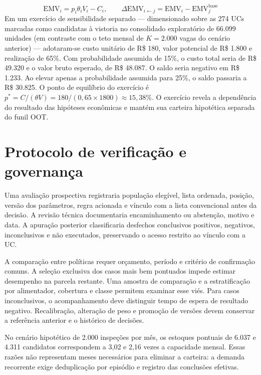 \begin{equation}\label{valor}
\mathrm{EMV}_i=p_i\theta_iV_i-C_i,\qquad \Delta\mathrm{EMV}_{i\leftarrow j}=\mathrm{EMV}_i-\mathrm{EMV}^{\mathrm{base}}_j
\end{equation}
Em um exercício de sensibilidade separado — dimensionado sobre as 274 UCs marcadas como candidatas à vistoria no consolidado exploratório de 66.099 unidades (em contraste com o teto mensal de $K=2.000$ vagas do cenário anterior) — adotaram-se custo unitário de R\$ 180, valor potencial de R\$ 1.800 e realização de 65\%. Com probabilidade assumida de 15\%, o custo total seria de R\$ 49.320 e o valor bruto esperado, de R\$ 48.087. O saldo seria negativo em R\$ 1.233. Ao elevar apenas a probabilidade assumida para 25\%, o saldo passaria a R\$ 30.825. O ponto de equilíbrio do exercício é $p^*=C/(\theta V)=180/(0{,}65\times 1800)\approx 15{,}38\%$. O exercício revela a dependência do resultado das hipóteses econômicas e mantém sua carteira hipotética separada do funil OOT.

\section{Protocolo de verificação e governança}
Uma avaliação prospectiva registraria população elegível, lista ordenada, posição, versão dos parâmetros, regra acionada e vínculo com a lista convencional antes da decisão. A revisão técnica documentaria encaminhamento ou abstenção, motivo e data. A apuração posterior classificaria desfechos conclusivos positivos, negativos, inconclusivos e não executados, preservando o acesso restrito ao vínculo com a UC.

A comparação entre políticas requer orçamento, período e critério de confirmação comuns. A seleção exclusiva dos casos mais bem pontuados impede estimar desempenho na parcela restante. Uma amostra de comparação e a estratificação por alimentador, cobertura e classe permitem examinar esse viés. Para casos inconclusivos, o acompanhamento deve distinguir tempo de espera de resultado negativo. Recalibração, alteração de peso e promoção de versões devem conservar a referência anterior e o histórico de decisões.


No cenário hipotético de 2.000 inspeções por mês, os estoques pontuais de 6.037 e 4.311 candidatos correspondem a 3,02 e 2,16 vezes a capacidade mensal. Essas razões não representam meses necessários para eliminar a carteira: a demanda recorrente exige deduplicação por episódio e registro das conclusões efetivas.


